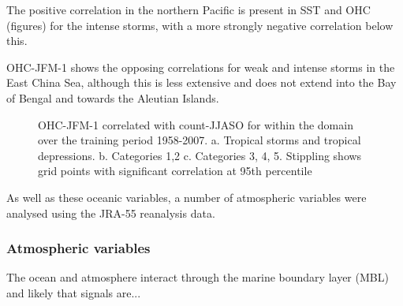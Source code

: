 
The positive correlation in the northern Pacific is present in SST and OHC (figures) for the intense storms, with a more strongly negative correlation below this.

OHC-JFM-1 shows the opposing correlations for weak and intense storms in the East China Sea, although this is less extensive and does not extend into the Bay of Bengal and towards the Aleutian Islands.

\begin{figure}
	\centering
	


	\caption{OHC-JFM-1 correlated with count-JJASO for within the domain over the training period 1958-2007. a. Tropical storms and tropical depressions. b. Categories 1,2 c. Categories 3, 4, 5. Stippling shows grid points with significant correlation at 95th percentile} \label{fig:ohc_prevJFM} 
\end{figure} 

As well as these oceanic variables, a number of atmospheric variables were analysed using the JRA-55 reanalysis data.

\subsubsection{Atmospheric variables}

The ocean and atmosphere interact through the marine boundary layer (MBL) and likely that signals are...


